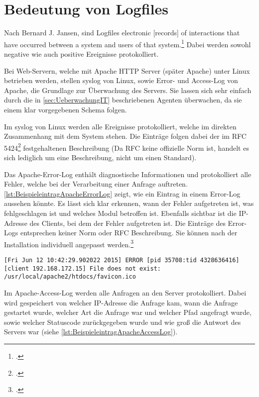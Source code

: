 \section{Bedeutung von Logfiles}\label{sec:BedeutungVonLogfiles}
Nach Bernard J. Jansen, sind Logfiles \flqq electronic [records] of interactions that have occurred between a system and users of that system\frqq.\footcite[S. 2]{Jansen.2008} Dabei werden sowohl negative wie auch positive Ereignisse protokolliert.

Bei Web-Servern, welche mit Apache \acs{HTTP} Server (später Apache) unter Linux betrieben werden, stellen syslog von Linux, sowie Error- und Access-Log von Apache, die Grundlage zur Überwachung des Servers. Sie lassen sich sehr einfach durch die in \autoref{sec:UeberwachungIT} beschriebenen Agenten überwachen, da sie einem klar vorgegebenen Schema folgen.

Im syslog von Linux werden alle Ereignisse protokolliert, welche im direkten Zusammenhang mit dem System stehen. Die Einträge folgen dabei der im \ac{RFC} 5424\footcite[RFC 5424,][]{RFC5424.2009} festgehaltenen Beschreibung (Da RFC keine offizielle Norm ist, handelt es sich lediglich um eine Beschreibung, nicht um einen Standard).

Das Apache-Error-Log enthält diagnostische Informationen und protokolliert alle Fehler, welche bei der Verarbeitung einer Anfrage auftreten. \autoref{lst:BeispieleintragApacheErrorLog} zeigt, wie ein Eintrag in einem Error-Log aussehen könnte. Es lässt sich klar erkennen, wann der Fehler aufgetreten ist, was fehlgeschlagen ist und welches Modul betroffen ist. Ebenfalls sichtbar ist die \ac{IP}-Adresse des Clients, bei dem der Fehler aufgetreten ist. Die Einträge des Error-Logs entsprechen keiner Norm oder \ac{RFC} Beschreibung. Sie können nach der Installation individuell angepasst werden.\footcite[Vgl.][]{ApacheErrorLog.2015} \\

\begin{lstlisting}[caption=Beispieleintrag für ein Apache-Error-Log,label=lst:BeispieleintragApacheErrorLog]
[Fri Jun 12 10:42:29.902022 2015] ERROR [pid 35708:tid 4328636416] [client 192.168.172.15] File does not exist: /usr/local/apache2/htdocs/favicon.ico
\end{lstlisting}

Im Apache-Access-Log werden alle Anfragen an den Server protokolliert. Dabei wird gespeichert von welcher \ac{IP}-Adresse die Anfrage kam, wann die Anfrage gestartet wurde, welcher Art die Anfrage war und welcher Pfad angefragt wurde, sowie welcher Statuscode zurückgegeben wurde und wie groß die Antwort des Servers war (siehe \autoref{lst:BeispieleintragApacheAccessLog}). \\


